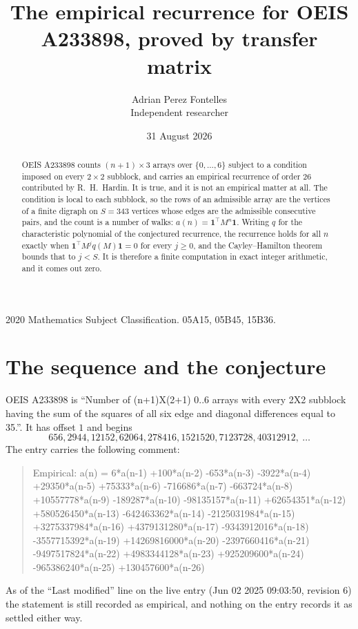 \documentclass[11pt,a4paper]{article}
\title{The empirical recurrence for OEIS A233898, proved by transfer matrix}
\author{Adrian Perez Fontelles\\ \small Independent researcher}
\date{31 August 2026}
\theoremstyle{plain}
\theoremstyle{definition}
\begin{document}
\maketitle

\begin{abstract}
OEIS A233898 counts $(n+1)\times3$ arrays over $\{0,\dots,6\}$ subject to a condition imposed on
every $2\times2$ subblock, and carries an empirical recurrence of order $26$ contributed
by R.~H.~Hardin. It is true, and it is not an empirical matter at all. The condition is local
to each subblock, so the rows of an admissible array are the vertices of a finite digraph
on $S=343$ vertices whose edges are the admissible consecutive pairs, and the count is a
number of walks: $a(n)=\mathbf{1}^{\!\top}M^{n}\mathbf{1}$. Writing $q$
for the characteristic polynomial of the conjectured recurrence, the recurrence holds for all
$n$ exactly when $\mathbf{1}^{\!\top}M^{j}q(M)\mathbf{1}=0$ for every $j\ge0$, and the
Cayley--Hamilton theorem bounds that to $j<S$. It is therefore a finite computation in exact
integer arithmetic, and it comes out zero.
\end{abstract}

\noindent\small 2020 Mathematics Subject Classification. 05A15, 05B45, 15B36.\normalsize

\section{The sequence and the conjecture}

OEIS A233898 is ``Number of (n+1)X(2+1) 0..6 arrays with every 2X2 subblock having the sum of the squares of all six edge and diagonal differences equal to 35.''. It has offset $1$ and begins
\[
656, 2944, 12152, 62064, 278416, 1521520, 7123728, 40312912,\ \dots
\]
The entry carries the following comment:
\begin{quote}\small
Empirical: a(n) = 6*a(n-1) +100*a(n-2) -653*a(n-3) -3922*a(n-4) +29350*a(n-5) +75333*a(n-6) -716686*a(n-7) -663724*a(n-8) +10557778*a(n-9) -189287*a(n-10) -98135157*a(n-11) +62654351*a(n-12) +580526450*a(n-13) -642463362*a(n-14) -2125031984*a(n-15) +3275337984*a(n-16) +4379131280*a(n-17) -9343912016*a(n-18) -3557715392*a(n-19) +14269816000*a(n-20) -2397660416*a(n-21) -9497517824*a(n-22) +4983344128*a(n-23) +925209600*a(n-24) -965386240*a(n-25) +130457600*a(n-26)
\end{quote}
As of the ``Last modified'' line on the live entry (Jun 02 2025 09:03:50, revision 6) the statement is
still recorded as empirical, and nothing on the entry records it as settled either way.
\end{document}
